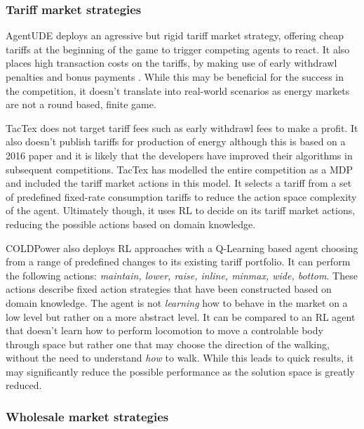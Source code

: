 \subsubsection{Tariff market strategies}%
\label{ssub:tariff_market_strategies}

AgentUDE deploys an agressive but rigid tariff market strategy, offering cheap tariffs at the beginning of the game to
trigger competing agents to react. It also places high transaction costs on the tariffs, by making use of early
withdrawl penalties and bonus payments \cite[]{ozdemir2017strategy}. While this may be beneficial for the success in the
competition, it doesn't translate into real-world scenarios as energy markets are not a round based, finite game. 

TacTex does not target tariff fees such as early withdrawl fees to make a profit. It also doesn't publish tariffs for
production of energy \cite[]{tactexurieli2016mdp} although this is based on a 2016 paper and it is likely that the developers have improved
their algorithms in subsequent competitions. TacTex has modelled the entire competition as a \ac{MDP} and included the
tariff market actions in this model. It selects a tariff from a set of predefined fixed-rate consumption tariffs to
reduce the action space complexity of the agent. Ultimately though, it uses \ac{RL} to decide on its tariff market
actions, reducing the possible actions based on domain knowledge.  

COLDPower also deploys \ac{RL} approaches with a Q-Learning based agent choosing from a range of predefined changes to
its existing tariff portfolio. It can perform the following actions: \emph{maintain, lower, raise, inline, minmax, wide,
bottom}. These actions describe fixed action strategies that have been constructed based on domain knowledge. The agent
is not \emph{learning} how to behave in the market on a low level but rather on a more abstract level. It can be
compared to an \ac{RL} agent that doesn't learn how to perform locomotion to move a controlable body through space but
rather one that may choose the direction of the walking, without the need to understand \emph{how} to walk. While this
leads to quick results, it may significantly reduce the possible performance as the solution space is greatly reduced. 

\subsubsection{Wholesale market strategies}%
\label{ssub:wholesale_market_strategies}


